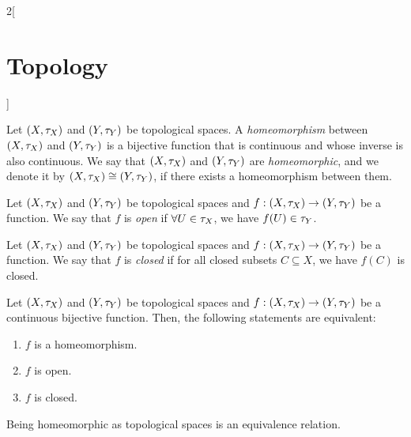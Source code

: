 \documentclass[../../../main.tex]{subfiles}
\begin{document}
\begin{multicols}{2}[\section{Topology}]
\begin{prop}
  \end{prop}
  \begin{definition}
    Let $(X,\tau_X)$ and $(Y,\tau_Y)$ be topological spaces. A \textit{homeomorphism} between $(X,\tau_X)$ and $(Y,\tau_Y)$ is a bijective function that is continuous and whose inverse is also continuous. We say that $(X,\tau_X)$ and $(Y,\tau_Y)$ are \textit{homeomorphic}, and we denote it by $(X,\tau_X)\cong(Y,\tau_Y)$, if there exists a homeomorphism between them.
  \end{definition}
  \begin{definition}
    Let $(X,\tau_X)$ and $(Y,\tau_Y)$ be topological spaces and $f:(X,\tau_X)\rightarrow (Y,\tau_Y)$ be a function. We say that $f$ is \textit{open} if $\forall U\in\tau_X$, we have $f(U)\in \tau_Y$.
  \end{definition}
  \begin{definition}
    Let $(X,\tau_X)$ and $(Y,\tau_Y)$ be topological spaces and $f:(X,\tau_X)\rightarrow (Y,\tau_Y)$ be a function. We say that $f$ is \textit{closed} if for all closed subsets $C\subseteq X$, we have $f(C)$ is closed.
  \end{definition}
  \begin{prop}
    Let $(X,\tau_X)$ and $(Y,\tau_Y)$ be topological spaces and $f:(X,\tau_X)\rightarrow (Y,\tau_Y)$ be a continuous bijective function. Then, the following statements are equivalent:
    \begin{enumerate}
      \item $f$ is a homeomorphism.
      \item $f$ is open.
      \item $f$ is closed.
    \end{enumerate}
  \end{prop}
  \begin{prop}
    Being homeomorphic as topological spaces is an equivalence relation.
  \end{prop}

\end{multicols}
\end{document}
